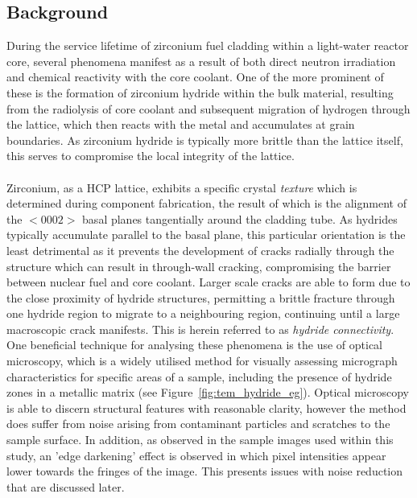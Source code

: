 \documentclass{article}
\begin{document}
	\subsection{Background}
	During the service lifetime of zirconium fuel cladding within a light-water reactor core, several phenomena manifest as a result of both direct neutron irradiation and chemical reactivity with the core coolant. One of the more prominent of these is the formation of zirconium hydride within the bulk material, resulting from the radiolysis of core coolant and subsequent migration of hydrogen through the lattice, which then reacts with the metal and accumulates at grain boundaries. As zirconium hydride is typically more brittle than the lattice itself, this serves to compromise the local integrity of the lattice. 
	\\
	\\
	Zirconium, as a HCP lattice, exhibits a specific crystal \textit{texture} which is determined during component fabrication, the result of which is the alignment of the $<0002>$ basal planes tangentially around the cladding tube. As hydrides typically accumulate parallel to the basal plane, this particular orientation is the least detrimental as it prevents the development of cracks radially through the structure which can result in through-wall cracking, compromising the barrier between nuclear fuel and core coolant. Larger scale cracks are able to form due to the close proximity of hydride structures, permitting a brittle fracture through one hydride region to migrate to a neighbouring region, continuing until a large macroscopic crack manifests. This is herein referred to as \textit{hydride connectivity}. One beneficial technique for analysing these phenomena is the use of optical microscopy, which is a widely utilised method for visually assessing micrograph characteristics for specific areas of a sample, including the presence of hydride zones in a metallic matrix (see Figure~\ref{fig:tem_hydride_eg}). Optical microscopy is able to discern structural features with reasonable clarity, however the method does suffer from noise arising from contaminant particles and scratches to the sample surface. In addition, as observed in the sample images used within this study, an 'edge darkening' effect is observed in which pixel intensities appear lower towards the fringes of the image. This presents issues with noise reduction that are discussed later.
	\\
\end{document}
